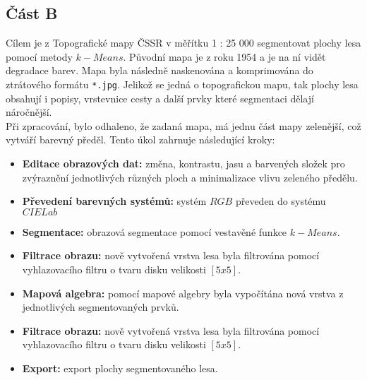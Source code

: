 \subsection*{Část B}
Cílem je z Topografické mapy ČSSR v měřítku 1 : 25 000 segmentovat plochy lesa pomocí metody $k-Means$. Původní mapa je z roku 1954 a je na ní vidět degradace barev. Mapa byla následně naskenována a komprimována do ztrátového formátu \texttt{*.jpg}. Jelikož se jedná o topografickou mapu, tak plochy lesa obsahují i popisy, vrstevnice cesty a další prvky které segmentaci dělají náročnější.\\
Při zpracování, bylo odhaleno, že zadaná mapa, má jednu část mapy zelenější, což vytváří barevný předěl. Tento úkol zahrnuje následující kroky: 
\begin{itemize}
    \item \textbf{Editace obrazových dat:} změna, kontrastu, jasu a barvených složek pro zvýraznění jednotlivých různých ploch a minimalizace vlivu zeleného předělu.
    \item \textbf{Převedení barevných systémů:} systém $RGB$ převeden do systému $CIE Lab$
    \item \textbf{Segmentace:} obrazová segmentace pomocí vestavěné funkce $k-Means$.
    \item \textbf{Filtrace obrazu:} nově vytvořená vrstva lesa byla filtrována pomocí vyhlazovacího filtru o tvaru disku velikosti $[5x5]$.
    \item \textbf{Mapová algebra:} pomocí mapové algebry byla vypočítána nová vrstva z jednotlivých segmentovaných prvků.
    \item \textbf{Filtrace obrazu:} nově vytvořená vrstva lesa byla filtrována pomocí vyhlazovacího filtru o tvaru disku velikosti $[5x5]$.
    \item \textbf{Export:} export plochy segmentovaného lesa.
\end{itemize}